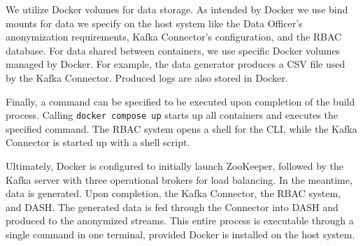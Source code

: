 We utilize Docker volumes for data storage. As intended by Docker we use bind mounts for data we specify on the host system like the Data Officer's anonymization requirements, Kafka Connector's configuration, and the \ac{RBAC} database. For data shared between containers, we use specific Docker volumes managed by Docker. For example, the data generator produces a CSV file used by the Kafka Connector. Produced logs are also stored in Docker. \par
Finally, a command can be specified to be executed upon completion of the build process. Calling \texttt{docker compose up} starts up all containers and executes the specified command. The \ac{RBAC} system opens a shell for the \ac{CLI}, while the Kafka Connector is started up with a shell script. \par
Ultimately, Docker is configured to initially launch ZooKeeper, followed by the Kafka server with three operational brokers for load balancing. In the meantime, data is generated. Upon completion, the Kafka Connector, the \ac{RBAC} system, and \ac{DASH}. The generated data is fed through the Connector into \ac{DASH} and produced to the anonymized streams. This entire process is executable through a single command in one terminal, provided Docker is installed on the host system. 